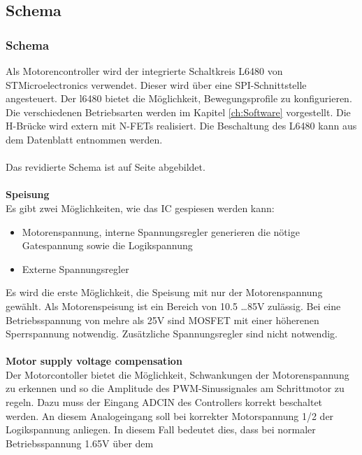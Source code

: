     \subsection{Schema} \label{sec:Schema}
    \fi
    \ifEMBED
    \subsubsection{Schema} \label{sec:Schema}
    \fi
    Als Motorencontroller wird der integrierte Schaltkreis L6480 von 
    STMicroelectronics verwendet. Dieser wird über eine SPI-Schnittstelle 
    angesteuert. Der l6480 bietet die Möglichkeit, Bewegungsprofile zu 
    konfigurieren. Die verschiedenen Betriebsarten werden im Kapitel 
    \ref{ch:Software} vorgestellt. Die H-Brücke wird extern mit N-FETs 
    realisiert. Die Beschaltung des L6480 kann aus dem Datenblatt 
    \cite{Datasheet:L6480} entnommen werden.\\\\ 
    Das revidierte Schema ist auf Seite \pageref{Schema} abgebildet.
    \\\\
    \textbf{Speisung}\\
    Es gibt zwei Möglichkeiten, wie das IC gespiesen werden kann: 
    \begin{itemize}
        \item Motorenspannung, interne Spannungsregler generieren die nötige 
            Gatespannung sowie die Logikspannung
        \item Externe Spannungsregler
    \end{itemize}
    Es wird die erste Möglichkeit, die Speisung mit nur der Motorenspannung 
    gewählt. Als Motorenspeisung ist ein Bereich von 10.5 \ldots 85\si{\volt} 
    zulässig. Bei eine Betriebsspannung von mehre als 25\si{\volt} sind MOSFET 
    mit einer höherenen Sperrspannung notwendig. Zusätzliche Spannungsregler 
    sind nicht notwendig. 
    \\\\
    \textbf{Motor supply voltage compensation}\\
    Der Motorcontoller bietet die Möglichkeit, Schwankungen der 
    Motorenspannung zu erkennen und so die Amplitude des PWM-Sinussignales am 
    Schrittmotor zu regeln. Dazu muss der Eingang ADCIN des Controllers 
    korrekt beschaltet werden. An diesem Analogeingang soll bei korrekter 
    Motorspannung 1/2 der Logikspannung anliegen. In diesem Fall bedeutet 
    dies, dass bei normaler Betriebsspannung 1.65\si{\volt} über dem 
